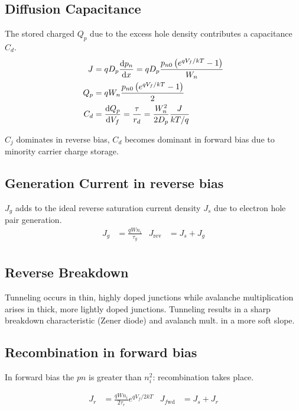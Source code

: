 \documentclass[a4paper, fontsize=8pt, landscape, DIV=1]{scrartcl}
\begin{document}
\begin{multicols*}{4}
    \subsection{Diffusion Capacitance}
    The stored charged $Q_p$ due to the excess hole density contributes a capacitance $C_d$.
    \begin{align*}
      J &= qD_p\frac{\mathrm{d}p_n}{\mathrm{d}x} = qD_p\frac{p_{n0}\left(e^{qV_f/kT}-1\right)}{W_n} \\
      Q_p &= qW_n\frac{p_{n0}\left(e^{qV_f/kT}-1\right)}{2} \\
      C_d &= \frac{\mathrm{d}Q_p}{\mathrm{d}V_f} = \frac{\tau}{r_d} = \frac{W_n^2}{2D_p}\frac{J}{kT/q}
    \end{align*}

    $C_j$ dominates in reverse bias, $C_d$ becomes dominant in forward bias due to minority carrier charge storage.


    \subsection{Generation Current in reverse bias}
    $J_g$ adds to the ideal reverse saturation current density $J_s$ due to electron hole pair generation.
    \begin{align*}
      J_g &= \frac{qWn_i}{\tau_g} & J_{\text{rev}} &= J_s + J_g\\
    \end{align*}

    \subsection{Reverse Breakdown}
    Tunneling occurs in thin, highly doped junctions while avalanche multiplication arises in thick, more lightly doped junctions.
    Tunneling results in a sharp breakdown characteristic (Zener diode) and avalanch mult. in a more soft slope.

    \subsection{Recombination in forward bias}
    In forward bias the $pn$ is greater than $n_i^2$: recombination takes place.

    \begin{align*}
      J_r &= \frac{qWn_i}{2\tau_r}e^{qV_f/2kT} & J_{f\text{wd}} &= J_s + J_r\\
    \end{align*}


\end{multicols*}
\end{document}
